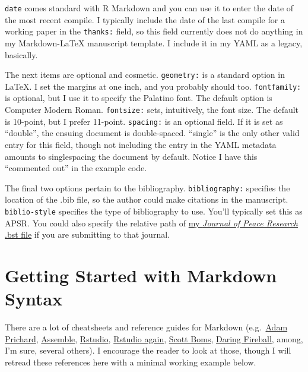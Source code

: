 \documentclass[11pt,]{article}
\begin{document}
\texttt{date} comes standard with R Markdown and you can use it to enter
the date of the most recent compile. I typically include the date of the
last compile for a working paper in the \texttt{thanks:} field, so this
field currently does not do anything in my Markdown-LaTeX manuscript
template. I include it in my YAML as a legacy, basically.

The next items are optional and cosmetic. \texttt{geometry:} is a
standard option in LaTeX. I set the margins at one inch, and you
probably should too. \texttt{fontfamily:} is optional, but I use it to
specify the Palatino font. The default option is Computer Modern Roman.
\texttt{fontsize:} sets, intuitively, the font size. The default is
10-point, but I prefer 11-point. \texttt{spacing:} is an optional field.
If it is set as ``double'', the ensuing document is double-spaced.
``single'' is the only other valid entry for this field, though not
including the entry in the YAML metadata amounts to singlespacing the
document by default. Notice I have this ``commented out'' in the example
code.

The final two options pertain to the bibliography.
\texttt{bibliography:} specifies the location of the .bib file, so the
author could make citations in the manuscript. \texttt{biblio-style}
specifies the type of bibliography to use. You'll typically set this as
APSR. You could also specify the relative path of
\href{http://svmiller.com/miscellany/journal-of-peace-research-bst-file/}{my
\emph{Journal of Peace Research} .bst file} if you are submitting to
that journal.

\hypertarget{getting-started-with-markdown-syntax}{%
\section{Getting Started with Markdown
Syntax}\label{getting-started-with-markdown-syntax}}

There are a lot of cheatsheets and reference guides for Markdown
(e.g.~\href{https://github.com/adam-p/markdown-here/wiki/Markdown-Cheatsheet}{Adam
Prichard},
\href{http://assemble.io/docs/Cheatsheet-Markdown.html}{Assemble},
\href{https://www.rstudio.com/wp-content/uploads/2015/02/rmarkdown-cheatsheet.pdf}{Rstudio},
\href{https://www.rstudio.com/wp-content/uploads/2015/03/rmarkdown-reference.pdf}{Rstudio
again},
\href{http://scottboms.com/downloads/documentation/markdown_cheatsheet.pdf}{Scott
Boms}, \href{https://daringfireball.net/projects/markdown/syntax}{Daring
Fireball}, among, I'm sure, several others). I encourage the reader to
look at those, though I will retread these references here with a
minimal working example below.
\end{document}
